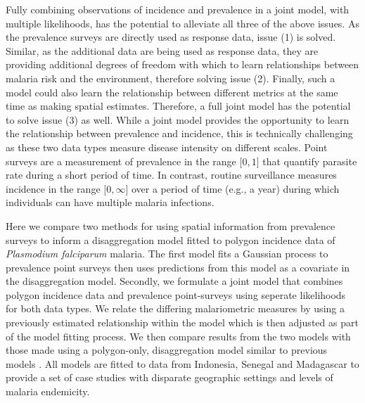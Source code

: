 \documentclass{statsoc}
\begin{document}
Fully combining observations of incidence and prevalence in a joint model, with multiple likelihoods, has the potential to alleviate all three of the above issues.
As the prevalence surveys are directly used as response data, issue (1) is solved.
Similar, as the additional data are being used as response data, they are providing additional degrees of freedom with which to learn relationships between malaria risk and the environment, therefore solving issue (2).
Finally, such a model could also learn the relationship between different metrics at the same time as making spatial estimates.
Therefore, a full joint model has the potential to solve issue (3) as well.
While a joint model provides the opportunity to learn the relationship between prevalence and incidence, this is technically challenging as these two data types measure disease intensity on different scales.
Point surveys are a measurement of prevalence in the range $\lbrack 0, 1\rbrack$ that quantify parasite rate during a short period of time.
In contrast, routine surveillance measures incidence in the range $\lbrack 0, \infty\rbrack$ over a period of time (e.g., a year) during which individuals can have multiple malaria infections.


Here we compare two methods for using spatial information from prevalence surveys to inform a disaggregation model fitted to polygon incidence data of \emph{Plasmodium falciparum}  malaria.
The first model fits a Gaussian process to prevalence point surveys then uses predictions from this model as a covariate in the disaggregation model.
Secondly, we formulate a joint model that combines polygon incidence data and prevalence point-surveys using seperate likelihoods for both data types.
We relate the differing malariometric measures by using a previously estimated relationship within the model \citep{cameron2015defining} which is then adjusted as part of the model fitting process.
We then compare results from the two models with those made using a polygon-only, disaggregation model similar to previous models \citep{sturrock2014fine, wilson2017pointless}.
All models are fitted to data from Indonesia, Senegal and Madagascar to provide a set of case studies with disparate geographic settings and levels of malaria endemicity.
\end{document}
